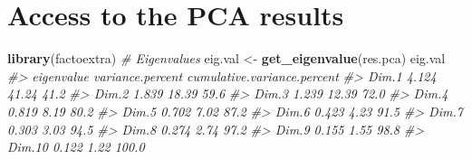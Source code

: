 \documentclass[]{book}
\newenvironment{Shaded}{\begin{snugshade}}{\end{snugshade}}
\newcommand{\CommentTok}[1]{\textcolor[rgb]{0.56,0.35,0.01}{\textit{#1}}}
\newcommand{\KeywordTok}[1]{\textcolor[rgb]{0.13,0.29,0.53}{\textbf{#1}}}
\newcommand{\NormalTok}[1]{#1}
\newcommand{\StringTok}[1]{\textcolor[rgb]{0.31,0.60,0.02}{#1}}
\begin{document}
\hypertarget{access-to-the-pca-results}{%
\section{Access to the PCA results}\label{access-to-the-pca-results}}

\begin{Shaded}
\begin{Highlighting}[]
\KeywordTok{library}\NormalTok{(factoextra)}
\CommentTok{# Eigenvalues}
\NormalTok{eig.val <-}\StringTok{ }\KeywordTok{get_eigenvalue}\NormalTok{(res.pca)}
\NormalTok{eig.val}
\CommentTok{#>        eigenvalue variance.percent cumulative.variance.percent}
\CommentTok{#> Dim.1       4.124            41.24                        41.2}
\CommentTok{#> Dim.2       1.839            18.39                        59.6}
\CommentTok{#> Dim.3       1.239            12.39                        72.0}
\CommentTok{#> Dim.4       0.819             8.19                        80.2}
\CommentTok{#> Dim.5       0.702             7.02                        87.2}
\CommentTok{#> Dim.6       0.423             4.23                        91.5}
\CommentTok{#> Dim.7       0.303             3.03                        94.5}
\CommentTok{#> Dim.8       0.274             2.74                        97.2}
\CommentTok{#> Dim.9       0.155             1.55                        98.8}
\CommentTok{#> Dim.10      0.122             1.22                       100.0}
  

\end{Highlighting}
\end{Shaded}
\end{document}

